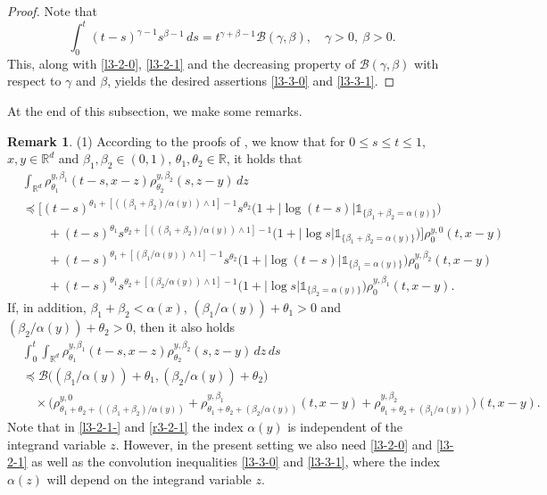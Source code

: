 \documentclass[a4paper,11pt]{amsart}
\renewcommand{\le}{\leqslant}
\newcommand{\R}{\mathds R}
\newcommand{\B}{\beta}
\newcommand{\T}{\theta}
\newcommand{\I}{\mathds 1}
\newcommand{\p}{\preceq}
\newcommand{\A}{\alpha}
\newcommand{\Bb}{\mathscr{B}}
\theoremstyle{definition}
\newtheorem{remark}[theorem]{Remark}
\begin{document}
\begin{proof}
Note that
\begin{equation*}
\int_0^t
(t-s)^{\gamma-1}s^{\B-1}\,ds=t^{\gamma+\B-1}\Bb(\gamma,\B),\quad
\gamma>0,\ \B>0.
\end{equation*}
This, along with  \eqref{l3-2-0}, \eqref{l3-2-1} and  the decreasing property of $\Bb(\gamma,\B)$ with respect to $\gamma$ and $\beta$, yields the desired assertions  \eqref{l3-3-0} and \eqref{l3-3-1}.
\end{proof}

At the end of this subsection, we make some remarks.


\begin{remark}\label{r3-3}
(1)  According to the proofs of \cite[Lemma 2.1 (ii) and (iii)]{CZ}, we know that for $0\le s\le t\le 1$, $x,y\in \R^d$ and $\B_1,\B_2
\in (0,1)$, $\T_1,\T_2\in \R$, it holds that
\begin{equation}\label{l3-2-1-}
\begin{split}
&\int_{\R^d} \rho_{\T_1}^{y,\beta_1}(t-s,x-z)\rho_{\T_2}^{y,\beta_2}(s,z-y)\, dz\\
 &\p \Big[(t-s)^{\T_1+[((\beta_1+\beta_2)/{\A(y)})\wedge 1]-1}s^{\T_2}
 \big(1+|\log (t-s)|\I_{\{\B_1+\B_2=\A(y)\}}\big)\\
 &\qquad+(t-s)^{\T_1}
s^{\T_2 +[((\beta_1+\beta_2)/{\A(y)})\wedge 1]-1} \big(1+|\log s|\I_{\{\B_1+\B_2=\A(y)\}}\big)\Big]\rho_{0}^{y,0}(t,x-y)\\
&\qquad +(t-s)^{\T_1+[({\beta_1}/{\A(y)})\wedge 1]-1}s^{\T_2} \big(1+|\log (t-s)|\I_{\{\B_1=\A(y)\}}\big)\rho_{0}^{y,\beta_2}(t,x-y)\\
&\qquad
+(t-s)^{\T_1}s^{\T_2+[({\beta_2}/{\A(y)})\wedge 1] -1} \big(1+|\log s|\I_{\{\B_2=\A(y)\}}\big)\rho_0^{y,\beta_1}(t,x-y).
\end{split}
\end{equation} If, in addition, $\B_1+\B_2<\A(x)$, $({\B_1}/{\A(y)})+\T_1>0$ and $({\B_2}/{\A(y)})+\T_2>0$, then it also holds
\begin{equation}\label{r3-2-1}
\begin{split}
&\int_0^t\int_{\R^d}\rho^{y,\B_1}_{\T_1}(t-s,x-z)
\rho^{y,\B_2}_{\T_2}(s,z-y)\,dz\,ds\\
&\p
\mathscr{B}\big(({\B_1}/{\A(y)})+\T_1,({\B_2}/{\A(y)})+\T_2\big)\\
&\quad \times \big(\rho^{y,0}_{\T_1+\T_2+(({\B_1+\B_2})/{\A(y)})} +\rho^{y,\B_1}_{\T_1+\T_2+({\B_2}/{\A(y)})}(t,x-y)
+\rho^{y,\B_2}_{\T_1+\T_2+({\B_1}/{\A(y)})}\big)(t,x-y).
\end{split}
\end{equation}
Note that in \eqref{l3-2-1-} and \eqref{r3-2-1} the index $\A(y)$ is independent of the
integrand variable $z$. However, in the present setting we also need \eqref{l3-2-0} and \eqref{l3-2-1} as well as the
convolution inequalities \eqref{l3-3-0} and \eqref{l3-3-1}, where the index $\A(z)$ will
depend on the integrand variable $z$.



\end{remark}
\end{document}
